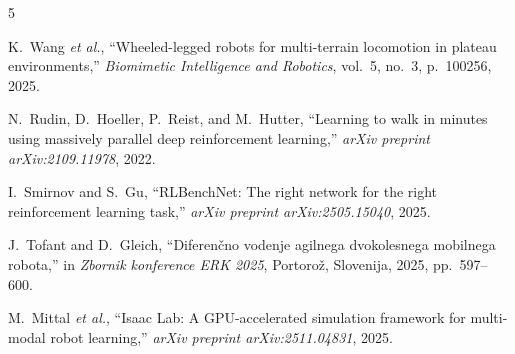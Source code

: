 \documentclass[a4paper]{article}
\begin{document}
\begin{thebibliography}{5}

K.~Wang \emph{et al.}, ``Wheeled-legged robots for multi-terrain
locomotion in plateau environments,'' \emph{Biomimetic Intelligence
and Robotics}, vol.~5, no.~3, p.~100256, 2025.

N.~Rudin, D.~Hoeller, P.~Reist, and M.~Hutter, ``Learning to walk in
minutes using massively parallel deep reinforcement learning,''
\emph{arXiv preprint arXiv:2109.11978}, 2022.

I.~Smirnov and S.~Gu, ``RLBenchNet: The right network for the right
reinforcement learning task,'' \emph{arXiv preprint
arXiv:2505.15040}, 2025.

J.~Tofant and D.~Gleich, ``Diferenčno vodenje agilnega
dvokolesnega mobilnega robota,'' in \emph{Zbornik konference ERK
2025}, Portoro\v{z}, Slovenija, 2025, pp.~597--600.

M.~Mittal \emph{et al.}, ``Isaac Lab: A GPU-accelerated simulation
framework for multi-modal robot learning,'' \emph{arXiv preprint
arXiv:2511.04831}, 2025.

\end{thebibliography}
  

\end{document}

